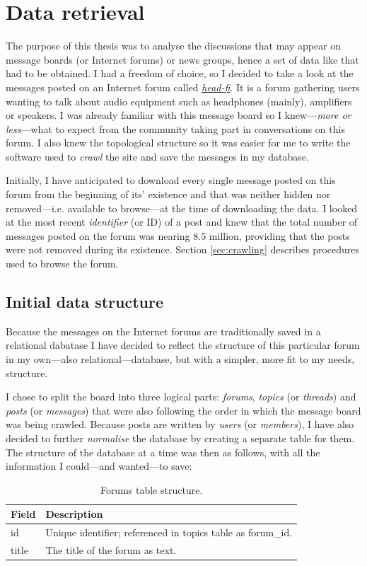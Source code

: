 \section{Data retrieval}

  The purpose of this thesis was to analyse the discussions that may appear on message boards (or Internet forums) or news groups, hence a set of data like that had to be obtained. I had a freedom of choice, so I decided to take a look at the messages posted on an Internet forum called \emph{\href{http://www.head-fi.org/f/}{head-fi}}. It is a forum gathering users wanting to talk about audio equipment such as headphones (mainly), amplifiers or speakers. I was already familiar with this message board so I knew---\textit{more or less}---what to expect from the community taking part in conversations on this forum. I also knew the topological structure so it was easier for me to write the software used to \emph{crawl} the site and save the messages in my database.
  
  Initially, I have anticipated to download every single message posted on this forum from the beginning of its' existence and that was neither hidden nor removed---i.e. available to browse---at the time of downloading the data. I looked at the most recent \emph{identifier} (or ID) of a post and knew that the total number of messages posted on the forum was nearing $8.5$ million, providing that the posts were not removed during its existence. Section \ref{sec:crawling} describes procedures used to browse the forum.
  
  \subsection{Initial data structure}
    Because the messages on the Internet forums are traditionally saved in a relational dabatase I have decided to reflect the structure of this particular forum in my own---also relational---database, but with a simpler, more fit to my needs, structure.
    
    I chose to split the board into three logical parts: \emph{forums}, \emph{topics} (or \emph{threads}) and \emph{posts} (or \emph{messages}) that were also following the order in which the message board was being crawled. Because posts are written by \emph{users} (or \emph{members}), I have also decided to further \emph{normalise} the database by creating a separate table for them. The structure of the database at a time was then as follows, with all the information I could---and wanted---to save:
    \begin{table}[H]
      \begin{tabularx}{\textwidth}{|L{0.3}|L{1.7}|} \hline
         \textbf{Field} & \textbf{Description} \\\hline
        id & Unique identifier; referenced in topics table as forum\_id. \\
        title & The title of the forum as text. \\\hline
      \end{tabularx}
      \caption{Forums table structure.}
    \end{table}
    
